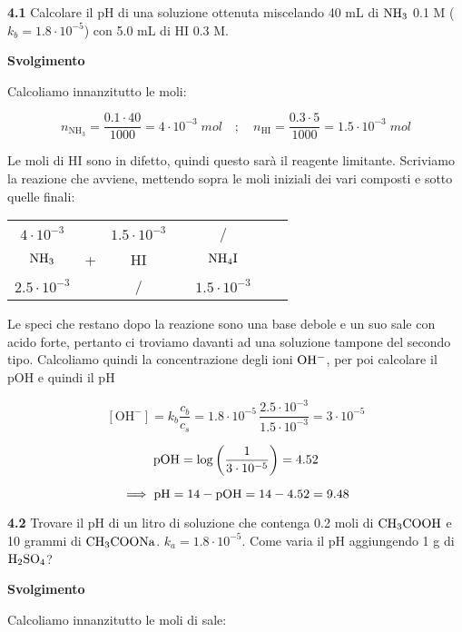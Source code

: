 \textbf{4.1} Calcolare il pH di una soluzione ottenuta miscelando 40 mL di $\rm NH_3$ 0.1 M ($k_b = 1.8 \cdot 10^{-5}$) con 5.0 mL di HI 0.3 M.

\vspace{0.2cm}\large\textbf{Svolgimento}\normalsize

\vspace{0.2cm}Calcoliamo innanzitutto le moli:

$$n_{\text{NH}_3}=\frac{0.1 \cdot 40}{1000}=4 \cdot 10^{-3} \; mol
\quad ; \quad
n_{\text{HI}}=\frac{0.3 \cdot 5}{1000}=1.5 \cdot 10^{-3} \; mol$$

Le moli di HI sono in difetto, quindi questo sarà il reagente limitante. Scriviamo la reazione che avviene, mettendo sopra le moli iniziali dei vari composti e sotto quelle finali:

\begin{center}
    \begin{tabular}{ccccccc}
        $4 \cdot 10^{-3}$ &  & $1.5 \cdot 10^{-3}$ & & /\\
        $\rm NH_3$ & + & HI & \ce{->} & $\rm NH_4I$ \\
        $2.5 \cdot 10^{-3}$ &  &  / & & $1.5 \cdot 10^{-3}$\\
    \end{tabular}
\end{center}

Le speci che restano dopo la reazione sono una base debole e un suo sale con acido forte, pertanto ci troviamo davanti ad una soluzione tampone del secondo tipo. Calcoliamo quindi la concentrazione degli ioni $\rm OH^-$, per poi calcolare il pOH e quindi il pH

$$[\text{OH}^-]=k_b\frac{c_b}{c_s}
=1.8 \cdot 10^{-5}\,\frac{2.5 \cdot 10^{-3}}{1.5 \cdot 10^{-3}}= 3 \cdot 10^{-5}$$

$$\rm pOH=\log\left(\frac{1}{3 \cdot 10^{-5}}\right)=4.52$$

$$\implies \rm pH=14-pOH=14-4.52=9.48$$

\vspace{0.2cm}\textbf{4.2} Trovare il pH di un litro di soluzione che contenga 0.2 moli di $\rm CH_3COOH$ e 10 grammi di $\rm CH_3COONa$. $k_a = 1.8 \cdot 10^{-5}$. Come varia il pH aggiungendo 1 g di $\rm H_2SO_4$?

\vspace{0.2cm}\large\textbf{Svolgimento}\normalsize

\vspace{0.2cm}Calcoliamo innanzitutto le moli di sale:

